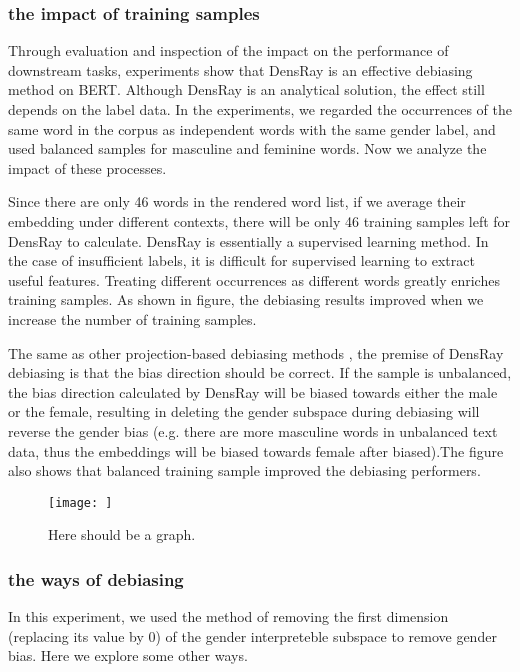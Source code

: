 \subsubsection{the impact of training samples}
Through evaluation and inspection of the impact on the performance of downstream tasks, experiments show that DensRay is an effective debiasing method on BERT. Although DensRay is an analytical solution, the effect still depends on the label data. In the experiments, we regarded the occurrences of the same word in the corpus as independent words with the same gender label, and used balanced samples for masculine and feminine words. Now we analyze the impact of these processes.

Since there are only 46 words in the rendered word list, if we average their embedding under different contexts, there will be only 46 training samples left for DensRay to calculate. DensRay is essentially a supervised learning method. In the case of insufficient labels, it is difficult for supervised learning to extract useful features. Treating different occurrences as different words greatly enriches training samples. As shown in figure, the debiasing results improved when we increase the number of training samples.

The same as other projection-based debiasing methods \citep{bolukbasi2016man,zhao2019gender,dev2019attenuating, karve2019conceptor}, the premise of DensRay debiasing is that the bias direction should be correct. If the sample is unbalanced, the bias direction calculated by DensRay will be biased towards either the male or the female, resulting in deleting the gender subspace during debiasing will reverse the gender bias (e.g. there are more masculine words in unbalanced text data, thus the embeddings will be biased towards female after biased).The figure also shows that balanced training sample improved the debiasing performers. 
\begin{figure*}
    \centering
    \texttt{[image: ]}
    \caption{Here should be a graph.}
    \label{fig:my_label}
\end{figure*}

\subsubsection{the ways of debiasing}
In this experiment, we used the method of removing the first dimension (replacing its value by $0$) of the gender interpreteble subspace to remove gender bias. Here we explore some other ways.

